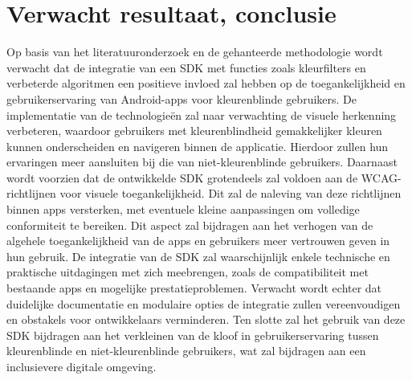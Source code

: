 \section{Verwacht resultaat, conclusie}%
\label{sec:verwachte_resultaten}
Op basis van het literatuuronderzoek en de gehanteerde methodologie wordt verwacht dat de 
integratie van een SDK met functies zoals kleurfilters en verbeterde algoritmen een positieve 
invloed zal hebben op de toegankelijkheid en gebruikerservaring van Android-apps voor kleurenblinde 
gebruikers. De implementatie van de technologieën zal naar verwachting de visuele herkenning 
verbeteren, waardoor gebruikers met kleurenblindheid gemakkelijker kleuren kunnen onderscheiden 
en navigeren binnen de applicatie. Hierdoor zullen hun ervaringen meer aansluiten bij die van 
niet-kleurenblinde gebruikers.
Daarnaast wordt voorzien dat de ontwikkelde SDK grotendeels zal voldoen aan de WCAG-richtlijnen voor 
visuele toegankelijkheid. Dit zal de naleving van deze richtlijnen binnen apps versterken, met 
eventuele kleine aanpassingen om volledige conformiteit te bereiken. Dit aspect zal bijdragen aan 
het verhogen van de algehele toegankelijkheid van de apps en gebruikers meer vertrouwen geven in 
hun gebruik.
De integratie van de SDK zal waarschijnlijk enkele technische en praktische uitdagingen met zich 
meebrengen, zoals de compatibiliteit met bestaande apps en mogelijke prestatieproblemen. Verwacht 
wordt echter dat duidelijke documentatie en modulaire opties de integratie zullen vereenvoudigen 
en obstakels voor ontwikkelaars verminderen.
Ten slotte zal het gebruik van deze SDK bijdragen aan het verkleinen van de kloof in 
gebruikerservaring tussen kleurenblinde en niet-kleurenblinde gebruikers, wat zal bijdragen aan een 
inclusievere digitale omgeving.


